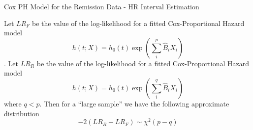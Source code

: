 \documentclass{beamer}
\theoremstyle{definition}
\begin{document}
\begin{frame}
\begin{block}{Cox PH Model for the Remission Data - HR Interval Estimation}
\begin{frame}
 Let $LR_F$ be the value of the log-likelihood for a fitted Cox-Proportional Hazard model
\[ h(t;X) = h_0(t) \exp(\sum_i^p \hat{B}_iX_i) \].
Let $LR_R$ be the value of the log-likelihood for a fitted Cox-Proportional Hazard model
\[ h(t;X) = h_0(t) \exp(\sum_i^q \hat{B}_iX_i) \]
where $q<p$.
Then for a ``large sample'' we have the following approximate distribution
\[
-2(LR_R - LR_F) \sim \chi^2(p-q)
\]
\end{frame}
%

\end{block}
\end{frame}
\end{document}
